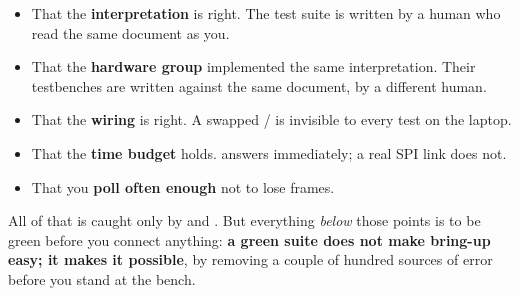 \begin{itemize}
  \item That the \textbf{interpretation} is right. The test suite is written by a human who read
    the same document as you.
  \item That the \textbf{hardware group} implemented the same interpretation. Their testbenches
    are written against the same document, by a different human.
  \item That the \textbf{wiring} is right. A swapped / is invisible to every
    test on the laptop.
  \item That the \textbf{time budget} holds.  answers immediately; a real SPI
    link does not.
  \item That you \textbf{poll often enough} not to lose frames.
\end{itemize}

All of that is caught only by  and . But everything
\emph{below} those points is to be green before you connect anything: \textbf{a green suite does
not make bring-up easy; it makes it possible}, by removing a couple of hundred sources of error
before you stand at the bench.
